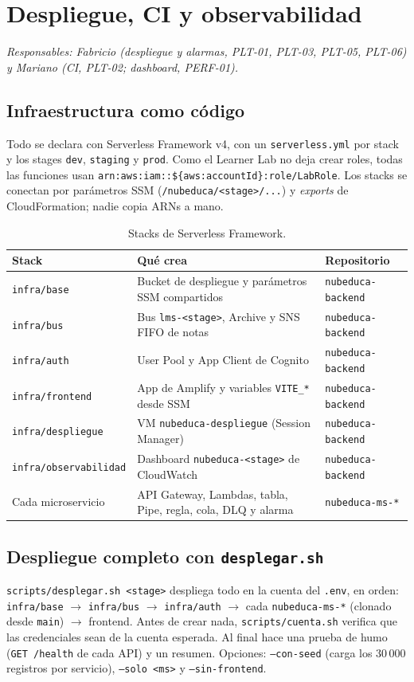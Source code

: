 \section{Despliegue, CI y observabilidad}
\label{sec:despliegue}
\textit{Responsables: Fabricio (despliegue y alarmas, PLT-01, PLT-03, PLT-05, PLT-06) y Mariano (CI,
PLT-02; dashboard, PERF-01).}

\subsection{Infraestructura como código}
Todo se declara con Serverless Framework v4, con un \texttt{serverless.yml} por stack y los stages
\texttt{dev}, \texttt{staging} y \texttt{prod}. Como el Learner Lab no deja crear roles, todas las
funciones usan \texttt{arn:aws:iam::\$\{aws:accountId\}:role/LabRole}. Los stacks se conectan por
parámetros SSM (\texttt{/nubeduca/<stage>/...}) y \textit{exports} de CloudFormation; nadie copia
ARNs a mano.

\begin{table}[htbp]
\centering\small
\begin{tabularx}{\textwidth}{lXl}
\toprule
Stack & Qué crea & Repositorio \\
\midrule
\texttt{infra/base} & Bucket de despliegue y parámetros SSM compartidos & \texttt{nubeduca-backend} \\
\texttt{infra/bus} & Bus \texttt{lms-<stage>}, Archive y SNS FIFO de notas & \texttt{nubeduca-backend} \\
\texttt{infra/auth} & User Pool y App Client de Cognito & \texttt{nubeduca-backend} \\
\texttt{infra/frontend} & App de Amplify y variables \texttt{VITE\_*} desde SSM & \texttt{nubeduca-backend} \\
\texttt{infra/despliegue} & VM \texttt{nubeduca-despliegue} (Session Manager) & \texttt{nubeduca-backend} \\
\texttt{infra/observabilidad} & Dashboard \texttt{nubeduca-<stage>} de CloudWatch & \texttt{nubeduca-backend} \\
Cada microservicio & API Gateway, Lambdas, tabla, Pipe, regla, cola, DLQ y alarma & \texttt{nubeduca-ms-*} \\
\bottomrule
\end{tabularx}
\caption{Stacks de Serverless Framework.}
\label{tab:stacks}
\end{table}

\subsection{Despliegue completo con \texttt{desplegar.sh}}
\texttt{scripts/desplegar.sh <stage>} despliega todo en la cuenta del \texttt{.env}, en orden:
\texttt{infra/base} $\rightarrow$ \texttt{infra/bus} $\rightarrow$ \texttt{infra/auth}
$\rightarrow$ cada \texttt{nubeduca-ms-*} (clonado desde \texttt{main}) $\rightarrow$ frontend.
Antes de crear nada, \texttt{scripts/cuenta.sh} verifica que las credenciales sean de la cuenta
esperada. Al final hace una prueba de humo (\texttt{GET /health} de cada API) y un resumen. Opciones:
\texttt{--con-seed} (carga los 30\,000 registros por servicio), \texttt{--solo <ms>} y
\texttt{--sin-frontend}.

